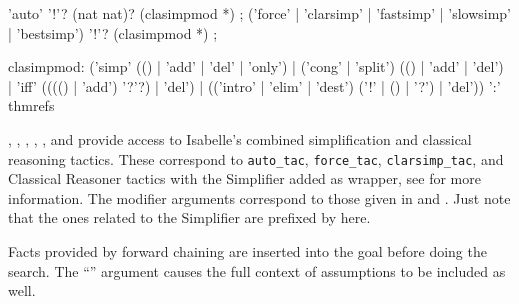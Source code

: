 \begin{isabellebody}
\begin{isamarkuptext}
  \begin{rail}
    'auto' '!'? (nat nat)? (clasimpmod *)
    ;
    ('force' | 'clarsimp' | 'fastsimp' | 'slowsimp' | 'bestsimp') '!'? (clasimpmod *)
    ;

    clasimpmod: ('simp' (() | 'add' | 'del' | 'only') |
      ('cong' | 'split') (() | 'add' | 'del') |
      'iff' (((() | 'add') '?'?) | 'del') |
      (('intro' | 'elim' | 'dest') ('!' | () | '?') | 'del')) ':' thmrefs
  \end{rail}

  \begin{descr}

  \item [\hyperlink{method.auto}{\mbox{\isa{auto}}}, \hyperlink{method.force}{\mbox{\isa{force}}}, \hyperlink{method.clarsimp}{\mbox{\isa{clarsimp}}}, \hyperlink{method.fastsimp}{\mbox{\isa{fastsimp}}}, \hyperlink{method.slowsimp}{\mbox{\isa{slowsimp}}}, and \hyperlink{method.bestsimp}{\mbox{\isa{bestsimp}}}] provide
  access to Isabelle's combined simplification and classical reasoning
  tactics.  These correspond to \verb|auto_tac|, \verb|force_tac|, \verb|clarsimp_tac|, and Classical Reasoner tactics with the Simplifier
  added as wrapper, see \cite[\S11]{isabelle-ref} for more
  information.  The modifier arguments correspond to those given in
   and .  Just note that
  the ones related to the Simplifier are prefixed by 
  here.

  Facts provided by forward chaining are inserted into the goal before
  doing the search.  The ``\isa{{\isachardoublequote}{\isacharbang}{\isachardoublequote}}'' argument causes the full
  context of assumptions to be included as well.


\end{descr}
\end{isamarkuptext}
\end{isabellebody}
